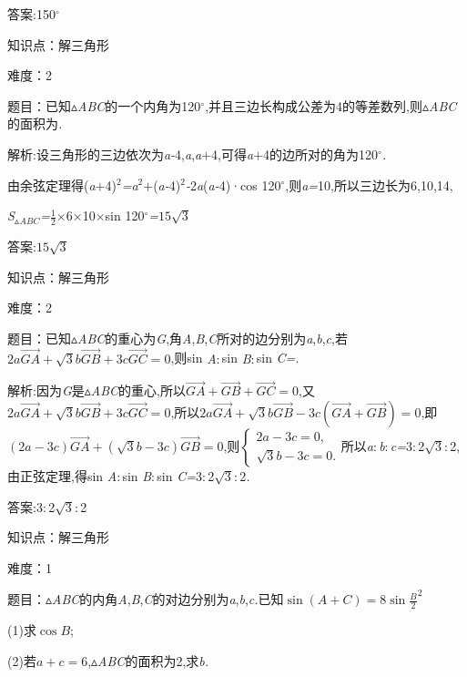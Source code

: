 \documentclass{article} %
\begin{document}
 答案:150$\mathrm{{}^\circ}$

知识点：解三角形

难度：2

 题目：已知$\mathrm{\vartriangle}$\textit{ABC}的一个内角为120$\mathrm{{}^\circ}$,并且三边长构成公差为4的等差数列,则$\mathrm{\vartriangle}$\textit{ABC}的面积为\textit{\underbar{　　　　　}.~}

 解析:设三角形的三边依次为\textit{a-}4,\textit{a},\textit{a$+$}4,可得\textit{a$+$}4的边所对的角为120$\mathrm{{}^\circ}$\textit{.}

由余弦定理得(\textit{a$+$}4)${}^{2}$\textit{=a}${}^{2}$\textit{$+$}(\textit{a-}4)${}^{2}$\textit{-}2\textit{a}(\textit{a-}4)·cos 120$\mathrm{{}^\circ}$,则\textit{a=}10,所以三边长为6,10,14,

\textit{S}${}_{\vartriangle }$\textit{${}_{ABC}$=}$\frac{1}{2}$\textit{$\times$}6\textit{$\times$}10\textit{$\times$}sin 120$\mathrm{{}^\circ}$\textit{=}$15\sqrt{3}$

 答案:$15\sqrt{3}$

知识点：解三角形

难度：2

 题目：已知$\mathrm{\vartriangle}$\textit{ABC}的重心为\textit{G},角\textit{A},\textit{B},\textit{C}所对的边分别为\textit{a},\textit{b},\textit{c},若$2a\vec{GA}+\sqrt{3}b\vec{GB}+3c\vec{GC}=0$,则sin \textit{A$:$}sin \textit{B$:$}sin \textit{C=\underbar{　　　　　}.~}

 解析:因为\textit{G}是$\mathrm{\vartriangle}$\textit{ABC}的重心,所以$\vec{GA}+\vec{GB}+\vec{GC}=0$,又$2a\vec{GA}+\sqrt{3}b\vec{GB}+3c\vec{GC}=0$,所以$2a\vec{GA}+\sqrt{3}b\vec{GB}-3c(\vec{GA}+\vec{GB})=0$,即$(2a-3c)\vec{GA}+(\sqrt{3}b-3c)\vec{GB}=0$,则$
\begin{cases}
2a-3c=0,\\
\sqrt{3}b-3c=0.
\end{cases}$所以\textit{a$:$b$:$c=}3\textit{$:$}2$\sqrt{3}$\textit{$:$}2,由正弦定理,得sin \textit{A$:$}sin \textit{B$:$}sin \textit{C=}3\textit{$:$}2$\sqrt{3}$\textit{$:$}2\textit{.}

 答案:3\textit{$:$}2$\sqrt{3}$\textit{$:$}2

知识点：解三角形

难度：1

 题目：$\mathrm{\vartriangle}$\textit{ABC}的内角\textit{A},\textit{B},\textit{C}的对边分别为\textit{a},\textit{b},\textit{c.}已知$\sin (A+C)=8{\sin \frac{B}{2}}^2$

 (1)求$\cos B$;

 (2)若$a+c=6$,$\mathrm{\vartriangle}$\textit{ABC}的面积为2,求\textit{b.}
\end{document}
